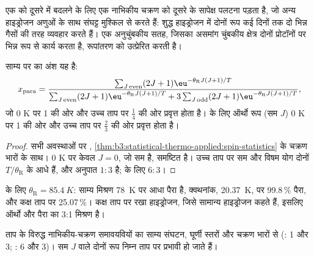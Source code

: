 एक को दूसरे में बदलने के लिए एक नाभिकीय चक्रण को दूसरे के सापेक्ष पलटना पड़ता है,
जो अन्य हाइड्रोजन अणुओं के साथ संघट्ट मुश्किल से करते हैं: शुद्ध
हाइड्रोजन में दोनों रूप कई दिनों तक दो भिन्न गैसों की तरह व्यवहार करते हैं। एक अनुचुंबकीय
सतह, जिसका असमांग चुंबकीय क्षेत्र दोनों प्रोटॉनों पर भिन्न रूप से कार्य करता है,
रूपांतरण को उत्प्रेरित करती है।

\begin{proposition}[साम्य ऑर्थो--पैरा अनुपात]\label{prop:b3:statistical-thermo-applied:ortho-para}
साम्य पर  का अंश यह है:
\[
  x_{\mathrm{para}} = \frac{\sum_{J\,\mathrm{even}}(2J+1)\eu^{-\theta_{\mathrm R}J(J+1)/T}}
    {\sum_{J\,\mathrm{even}}(2J+1)\eu^{-\theta_{\mathrm R}J(J+1)/T} + 3\sum_{J\,\mathrm{odd}}(2J+1)\eu^{-\theta_{\mathrm R}J(J+1)/T}},
\]
जो 0 K पर 1 की ओर और उच्च ताप पर $\frac14$ की ओर प्रवृत्त होता है।  के लिए ऑर्थो रूप
(सम $J$) 0 K पर 1 की ओर और उच्च ताप पर $\frac23$ की ओर प्रवृत्त होता है।
\end{proposition}

\begin{proof}
सभी अवस्थाओं पर ,
\cref{thm:b3:statistical-thermo-applied:spin-statistics} के चक्रण भारों के साथ। 0 K पर केवल $J = 0$, जो
सम है, समष्टित है। उच्च ताप पर सम और विषम योग दोनों
$T/\theta_{\mathrm R}$ के आधे हैं, और अनुपात $1 : 3$ है;  के लिए $6 : 3$।
\end{proof}

 के लिए $\theta_{\mathrm R} = \qty{85.4}{K}$: साम्य मिश्रण \qty{78}{K} पर आधा पैरा है,
क्वथनांक, \qty{20.37}{K}, पर 99.8\,\% पैरा, और कक्ष
ताप पर 25.07\,\%। कक्ष ताप पर रखा हाइड्रोजन, जिसे सामान्य हाइड्रोजन कहते हैं,
इसलिए ऑर्थो और पैरा का 3:1 मिश्रण है।

\begin{omfigure}

{\small ताप के विरुद्ध नाभिकीय-चक्रण समावयवियों का साम्य संघटन,
घूर्णी स्तरों और चक्रण भारों से (: 1 और 3;
: 6 और 3)। सम $J$ वाले दोनों रूप निम्न ताप पर प्रभावी हो जाते हैं।}
\end{omfigure}

